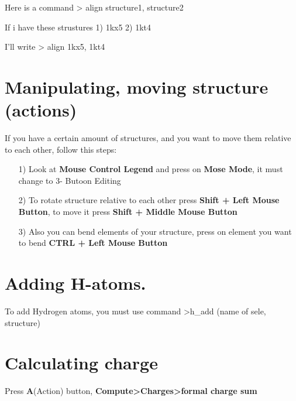 \documentclass{article}
\begin{document}
Here is a command > align structure1, structure2

If i have these strustures
1) 1kx5
2) 1kt4

I'll write > align 1kx5, 1kt4






\section{Manipulating, moving structure (actions)}

If you have a certain amount of structures, and you want to move them relative to each other, follow this steps:

\begin{itemize}

    \item[1)] Look at \textbf{Mouse Control Legend} and press on {\color{green} \textbf{Mose Mode}}, it must change to {\color{pink} 3- Butoon Editing}
    
    \item[2)] To rotate structure relative to each other press \textbf{Shift + Left Mouse Button}, to move it press \textbf{Shift + Middle Mouse Button}
    
    \item[3)] Also you can bend elements of your structure, press on element you want to bend \textbf{CTRL + Left Mouse Button}
    
\end{itemize}








\section{Adding H-atoms.}

To add Hydrogen atoms, you must use command >h\_add (name of sele, structure)








\section{Calculating charge}

Press {\Large \textbf{A}}(Action) button, \textbf{Compute>Charges>formal charge sum}
\end{document}
